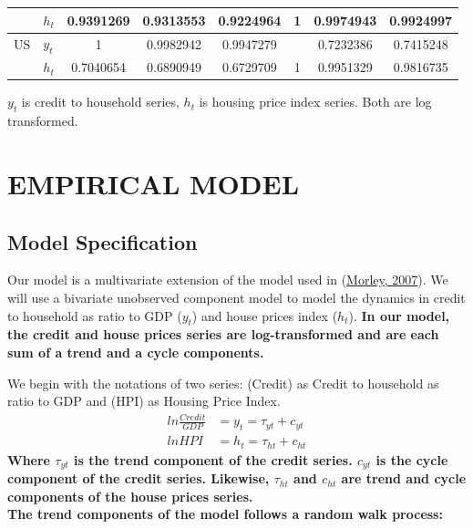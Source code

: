 \documentclass[
  12pt,
]{article}
\begin{document}
\begin{center}
\begin{threeparttable}
\begin{tabular}{@{}llSSSSSS@{}}
                    & $h_t$ & 0.9391269 & 0.9313553& 0.9224964 & 1 & 0.9974943 & 0.9924997 \\[2pt] 
                    \midrule
                    US & $y_t$ & 1 & 0.9982942 & 0.9947279 & & 0.7232386 & 0.7415248  \\[2pt] 
                    
                    & $h_t$ & 0.7040654 & 0.6890949 & 0.6729709 & 1 & 0.9951329 & 0.9816735 \\[2pt] 
                    
                    \bottomrule
                \end{tabular}
                            \begin{tablenotes}
                                \small
                                \item $y_t$ is credit to household series, $h_t$ is housing price index series. Both are log transformed. \\
                            \end{tablenotes}
            \end{threeparttable}
            \end{center}

\hypertarget{empirical-model}{%
\section{EMPIRICAL MODEL}\label{empirical-model}}

\hypertarget{model-specification}{%
\subsection{Model Specification}\label{model-specification}}

Our model is a multivariate extension of the model used in (\protect\hyperlink{ref-morley_slow_2007}{Morley, 2007}). We will use a bivariate unobserved component model to model the dynamics in credit to household as ratio to GDP (\(y_t\)) and house prices index (\(h_t\)). \textbf{In our model, the credit and house prices series are log-transformed and are each sum of a trend and a cycle components.}

        We begin with the notations of two series: (Credit) as Credit to household as ratio to GDP and (HPI) as Housing Price Index.
        \begin{align}
        ln \frac{Credit}{GDP} &= y_t = \tau_{yt} + c_{yt}
        \\
        ln HPI &= h_t = \tau_{ht} + c_{ht}
        \end{align}
        \textbf{Where $\tau_{yt}$ is the trend component of the credit series. $c_{yt}$ is the cycle component of the credit series. Likewise, $\tau_{ht}$ and $c_{ht}$ are trend and cycle components of the house prices series.}
        \\
        \textbf{The trend components of the model follows a random walk process:}
        
\end{document}
